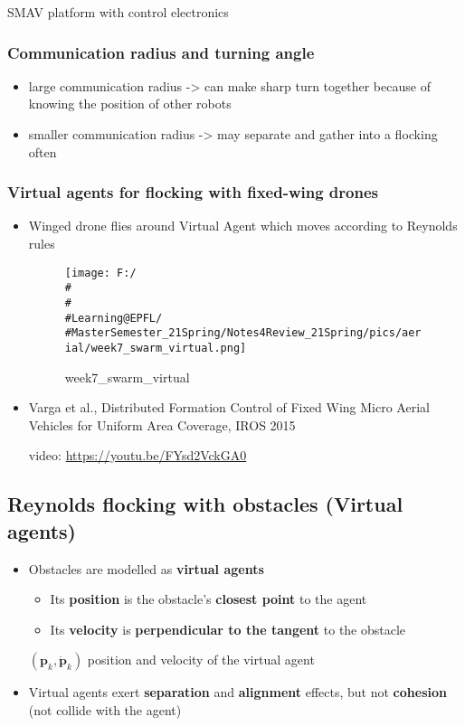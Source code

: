 \documentclass[]{article}
\begin{document}
SMAV platform with control electronics

\subsubsection{Communication radius and turning
angle}\label{header-n1323}

\begin{itemize}
\item
  large communication radius -\textgreater{} can make sharp turn
  together because of knowing the position of other robots
\item
  smaller communication radius -\textgreater{} may separate and gather
  into a flocking often
\end{itemize}

\subsubsection{Virtual agents for flocking with fixed-wing
drones}\label{header-n1329}

\begin{itemize}
\item
  Winged drone flies around Virtual Agent which moves according to
  Reynolds rules

  \begin{figure}
  \centering
  \texttt{[image: F:/\\\#\\\#\\\#Learning@EPFL/\\\#MasterSemester\_21Spring/Notes4Review\_21Spring/pics/aerial/week7\_swarm\_virtual.png]}
  \caption{week7\_swarm\_virtual}
  \end{figure}
\item
  Varga et al., Distributed Formation Control of Fixed Wing Micro Aerial
  Vehicles for Uniform Area Coverage, IROS 2015

  video: \url{https://youtu.be/FYsd2VckGA0}
\end{itemize}

\subsection{Reynolds flocking with obstacles (Virtual
agents)}\label{header-n1337}

\begin{itemize}
\item
  Obstacles are modelled as \textbf{virtual agents}

  \begin{itemize}
  \item
    Its \textbf{position} is the obstacle's \textbf{closest point} to
    the agent
  \item
    Its \textbf{velocity} is \textbf{perpendicular to the tangent} to
    the obstacle
  \end{itemize}

  \((\mathbf{p}_k, \dot{\mathbf{p}}_k)\) position and velocity of the
  virtual agent
\item
  Virtual agents exert \textbf{separation} and \textbf{alignment}
  effects, but not \textbf{cohesion} (not collide with the agent)
\end{itemize}
\end{document}
